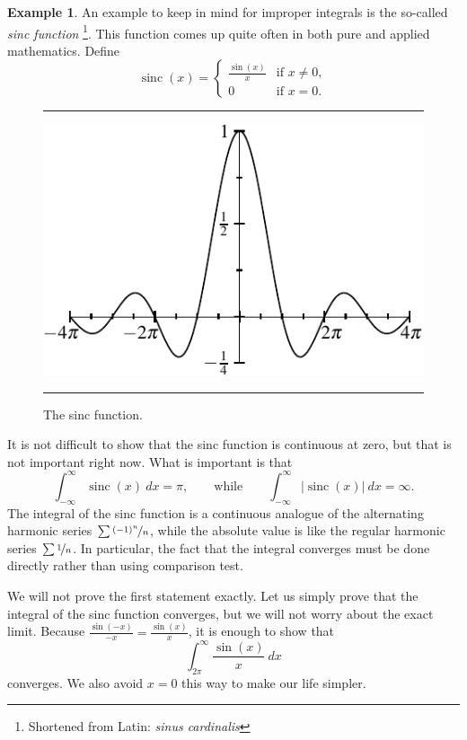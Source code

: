 \documentclass[12pt]{book}
\newenvironment{myfigureht}{%
\begin{figure}[h!t]
\noindent\rule{\textwidth}{0.4pt}\vspace{12pt}\par\centering}%
{\par\noindent\rule{\textwidth}{0.4pt}
\end{figure}}
\newcommand{\abs}[1]{\left\lvert {#1} \right\rvert}
\newcommand{\myindex}[1]{#1\index{#1}}
\theoremstyle{plain}
\theoremstyle{remark}
\theoremstyle{definition}
\theoremstyle{exercise}
\theoremstyle{example}
\newtheorem{example}[thm]{Example}
\begin{document}
\begin{example}
An example to keep in mind for improper integrals
is the so-called \emph{\myindex{sinc function}}%
\footnote{Shortened from Latin: \emph{sinus cardinalis}}.
This function comes up quite often
in both pure and applied mathematics.  Define
\begin{equation*}
\operatorname{sinc}(x) =
\begin{cases}
\frac{\sin(x)}{x} & \text{if $x \not= 0$} , \\
0 & \text{if $x = 0$} .
\end{cases}
\end{equation*}
\begin{myfigureht}
\includegraphics{figures/sincfig}
\caption{The sinc function.
\label{figsinc}}
\end{myfigureht}

It is not difficult to show that
the sinc function is continuous at zero, but that is
not important right now.  What is important is that
\begin{equation*}
\int_{-\infty}^\infty \operatorname{sinc}(x) ~dx = \pi ,
\qquad \text{while} \qquad
\int_{-\infty}^\infty \abs{\operatorname{sinc}(x)} ~dx = \infty .
\end{equation*}
The integral of the sinc function is a continuous analogue of the
alternating harmonic series $\sum \nicefrac{{(-1)}^n}{n}$, while the
absolute value is like the regular harmonic series $\sum \nicefrac{1}{n}$.
In particular, the fact that the integral converges must be done directly
rather than using comparison test.

We will not prove the first statement exactly.  Let us simply prove
that the integral of the sinc function converges, but we will not worry
about the exact limit.  Because $\frac{\sin(-x)}{-x} = \frac{\sin(x)}{x}$, it is
enough to show that
\begin{equation*}
\int_{2\pi}^\infty \frac{\sin(x)}{x}~dx
\end{equation*}
converges.  We
also avoid $x=0$ this way to make our life simpler.


\end{example}
\end{document}
